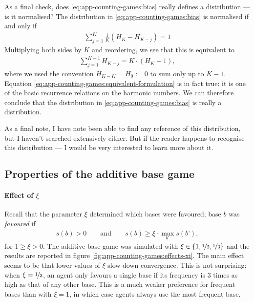 \documentclass{../src/bcthesispart}
\begin{document}
As a final check, does \eqref{eq:app-counting-games:bias} really defines a distribution — is it normalised?
The distribution in \eqref{eq:app-counting-games:bias} is normalised if and only if
\begin{align}
	\sum_{j=1}^K \frac{1}{K}(H_K - H_{K-j}) = 1
\end{align}
Multiplying both sides by $K$ and reordering, we see that this is equivalent to
\begin{align}
	\label{eq:app-counting-games:equivalent-formulation}
	\sum_{j=1}^{K-1} H_{K-j} = K \cdot (H_K - 1),
\end{align}
where we used the convention $H_{K-K}=H_0 := 0$ to sum only up to $K-1$.
Equation \ref{eq:app-counting-games:equivalent-formulation} is in fact true: it is one of the basic recurrence relations on the  harmonic numbers.
We can therefore conclude that the distribution in \eqref{eq:app-counting-games:bias} is really a distribution.

As a final note, I have note been able to find any reference of this distribution, but I haven’t searched extensively either.
But if the reader happens to recognise this distribution — I would be very interested to learn more about it.



\subsection{Properties of the additive base game}


\paragraph{Effect of $\xi$}
Recall that the parameter $\xi$ determined which bases were favoured; base $b$ was \emph{favoured} if 
\begin{align}
	s(b) > 0 
	\qquad \text{and} \qquad 
	s(b) \ge \xi \cdot \max_{b’} s(b’),
\end{align}
for $1 \ge \xi > 0$.
The additive base game was simulated with $\xi \in \{1, \nicefrac{1}{2}, \nicefrac{1}{3}\}$ and the results are reported in figure \ref{fig:app-counting-games:effects-xi}.
The main effect seems to be that lower values of $\xi$ slow down convergence.
This is not surprising: when $\xi=\nicefrac{1}{3}$, an agent only favours a single base if its frequency is 3 times as high as that of any other base.
This is a much weaker preference for frequent bases than with $\xi=1$, in which case agents always use the most frequent base. 
\end{document}

